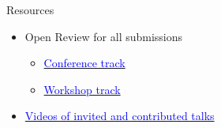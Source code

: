 \documentclass[]{beamer}
\begin{document}
\begin{frame}{Resources}
\begin{itemize}
\item Open Review for all submissions
  \begin{itemize}
  \item \href{https://openreview.net/group?id=ICLR.cc/2017/conference}{\textcolor{blue}{Conference track}}
  \item \href{https://openreview.net/group?id=ICLR.cc/2017/workshop}{\textcolor{blue}{Workshop track}}
  \end{itemize}
\item \href{https://www.facebook.com/pg/iclr.cc/videos/}{\textcolor{blue}{Videos of invited and contributed talks}}
\end{itemize}
\end{frame}
\end{document}
